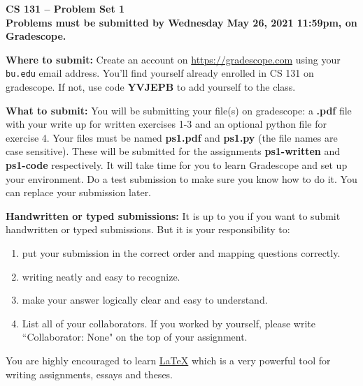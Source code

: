\documentclass[11pt]{article}
\theoremstyle{definition}
\newcommand{\problemset}[2]{
  \begin{center}
  \Large{\textbf{CS 131 -- Problem Set #1}}\\
  \large{\textbf{Problems must be submitted by #2, on Gradescope.}}
  \end{center}
}
\begin{document}
\problemset{1}{Wednesday May 26, 2021 11:59pm}

\noindent \textbf{Where to submit:}
Create an account on \url{https://gradescope.com} using your \texttt{bu.edu} email address. You'll find yourself already enrolled in CS 131 on gradescope. If not, use code \textbf{YVJEPB} to add yourself to the class. 

\vspace{3mm}

\noindent \textbf{What to submit:} You will be submitting your file(s) on gradescope: a \textbf{.pdf} file with your write up for written exercises 1-3 and an optional python file for exercise 4. Your files must be named \textbf{ps1.pdf} and \textbf{ps1.py} (the file names are case sensitive). These will be submitted for the assignments \textbf{ps1-written} and \textbf{ps1-code} respectively. It will take time for you to learn Gradescope and set up your environment. Do a test submission to make sure you know how to do it. You can replace your submission later.

\vspace{3mm}

\noindent \textbf{Handwritten or typed submissions:} It is up to you if you want to submit handwritten or typed submissions. But it is your responsibility to:
\begin{enumerate}
    \item put your submission in the correct order and mapping questions correctly.
    \item writing neatly and easy to recognize.
    \item  make your answer logically clear and easy to understand.
    \item List all of your collaborators. If you worked by yourself, please write ``Collaborator: None" on the top of your assignment.
\end{enumerate}

\noindent You are highly encouraged to learn \href{https://learn.bu.edu/webapps/blackboard/content/listContentEditable.jsp?content_id=_8778123_1&course_id=_74284_1}{LaTeX} which is a very powerful tool for writing assignments, essays and theses.
\end{document}
